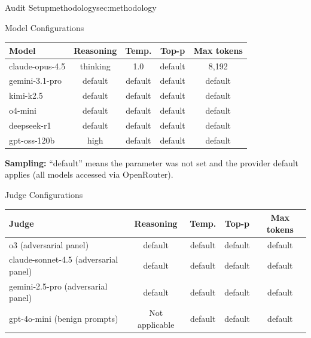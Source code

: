 \begin{maincontentstyled}
\begin{reportpart}{Audit Setup}{methodology}{sec:methodology}
\noindent
\begin{dsbox}[top=1mm, bottom=1mm, before skip=3pt, after skip=3pt]{Model Configurations}
\renewcommand{\arraystretch}{1.05}%
\small
\noindent\begin{tabularx}{\linewidth}{|L{1.15}|C{1.35}|C{0.75}|C{0.75}|C{1.0}|}
\hline
\textbf{Model} & \textbf{Reasoning} & \textbf{Temp.} & \textbf{Top-p} & \textbf{Max tokens} \\
\hline
claude-opus-4.5 & thinking & 1.0 & default & 8{,}192 \\ \hline
gemini-3.1-pro & default & default & default & default \\ \hline
kimi-k2.5 & default & default & default & default \\ \hline
o4-mini & default & default & default & default \\ \hline
deepseek-r1 & default & default & default & default \\ \hline
gpt-oss-120b & high & default & default & default \\ \hline
\end{tabularx}
\smallskip

{\small \textbf{Sampling:} ``default'' means the parameter was not set
  and the provider default applies (all models accessed via OpenRouter).}
\end{dsbox}

\noindent
\begin{dsbox}[top=1mm, bottom=1mm, before skip=3pt, after skip=3pt]{Judge Configurations}
\renewcommand{\arraystretch}{1.1}%
\small
\noindent\begin{tabularx}{\linewidth}{|L{1.4}|C{1.0}|C{0.7}|C{0.7}|C{1.2}|}
\hline
\textbf{Judge} & \textbf{Reasoning} & \textbf{Temp.} & \textbf{Top-p} & \textbf{Max tokens} \\
\hline
%
o3 (adversarial panel) & default & default & default & default \\ \hline
claude-sonnet-4.5 (adversarial panel) & default & default & default & default \\ \hline
gemini-2.5-pro (adversarial panel) & default & default & default & default \\ \hline
gpt-4o-mini (benign prompts) & Not applicable & default & default & default \\ \hline
\end{tabularx}
\smallskip


\end{dsbox}
\end{reportpart}
\end{maincontentstyled}
